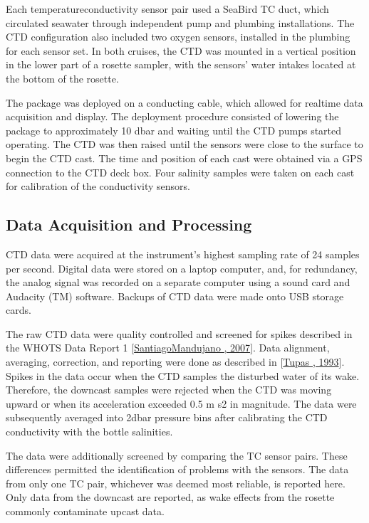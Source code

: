 \documentclass[a4paper,10pt,english,openany,oneside]{sphinxmanual}
\begin{document}
\sphinxAtStartPar
Each temperature\sphinxhyphen{}conductivity sensor pair used a Sea\sphinxhyphen{}Bird TC duct, which
circulated seawater through independent pump and plumbing installations. The
CTD configuration also included two oxygen sensors, installed in the plumbing
for each sensor set. In both cruises, the CTD was mounted in a vertical
position in the lower part of a rosette sampler, with the sensors’ water
intakes located at the bottom of the rosette.

\sphinxAtStartPar
The package was deployed on a conducting cable, which allowed for real\sphinxhyphen{}time
data acquisition and display. The deployment procedure consisted of lowering
the package to approximately 10 dbar and waiting until the CTD pumps started
operating. The CTD was then raised until the sensors were close to the surface
to begin the CTD cast. The time and position of each cast were obtained via a
GPS connection to the CTD deck box. Four salinity samples were taken on each
cast for calibration of the conductivity sensors.


\subsection{Data Acquisition and Processing}
\label{\detokenize{4_section:data-acquisition-and-processing}}
\sphinxAtStartPar
CTD data were acquired at the instrument’s highest sampling rate of 24 samples
per second. Digital data were stored on a laptop computer, and, for redundancy,
the analog signal was recorded on a separate computer using a sound card and
Audacity (TM) software. Backups of CTD data were made onto USB storage cards.

\sphinxAtStartPar
The raw CTD data were quality controlled and screened for spikes described in
the WHOTS Data Report 1 {[}\hyperlink{cite.references:id15}{Santiago\sphinxhyphen{}Mandujano , 2007}{]}. Data alignment,
averaging, correction, and reporting were done as described in
{[}\hyperlink{cite.references:id20}{Tupas , 1993}{]}. Spikes in the data occur when the CTD samples the disturbed
water of its wake. Therefore, the downcast samples were rejected when the CTD
was moving upward or when its acceleration exceeded 0.5 m s\sphinxhyphen{}2 in magnitude. The
data were subsequently averaged into 2\sphinxhyphen{}dbar pressure bins after calibrating the
CTD conductivity with the bottle salinities.

\sphinxAtStartPar
The data were additionally screened by comparing the T\sphinxhyphen{}C sensor pairs. These
differences permitted the identification of problems with the sensors. The data
from only one T\sphinxhyphen{}C pair, whichever was deemed most reliable, is reported here.
Only data from the downcast are reported, as wake effects from the rosette
commonly contaminate upcast data.
\end{document}
